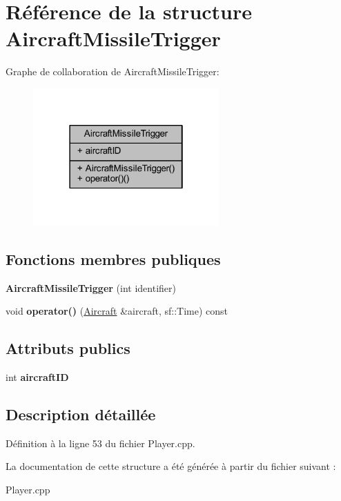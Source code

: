 \hypertarget{struct_aircraft_missile_trigger}{}\section{Référence de la structure Aircraft\+Missile\+Trigger}
\label{struct_aircraft_missile_trigger}


Graphe de collaboration de Aircraft\+Missile\+Trigger\+:\nopagebreak
\begin{figure}[H]
\begin{center}
\leavevmode
\includegraphics[width=202pt]{struct_aircraft_missile_trigger__coll__graph}
\end{center}
\end{figure}
\subsection*{Fonctions membres publiques}
\begin{DoxyCompactItemize}
\item 
\hypertarget{struct_aircraft_missile_trigger_a05b8d18e37581dc415b49b51d0ad2a11}{}\label{struct_aircraft_missile_trigger_a05b8d18e37581dc415b49b51d0ad2a11} 
{\bfseries Aircraft\+Missile\+Trigger} (int identifier)
\item 
\hypertarget{struct_aircraft_missile_trigger_a3e59059be448c10457d9b910312429f6}{}\label{struct_aircraft_missile_trigger_a3e59059be448c10457d9b910312429f6} 
void {\bfseries operator()} (\hyperlink{class_aircraft}{Aircraft} \&aircraft, sf\+::\+Time) const
\end{DoxyCompactItemize}
\subsection*{Attributs publics}
\begin{DoxyCompactItemize}
\item 
\hypertarget{struct_aircraft_missile_trigger_a27559c46b1b2fc265af9c216ffc1379f}{}\label{struct_aircraft_missile_trigger_a27559c46b1b2fc265af9c216ffc1379f} 
int {\bfseries aircraft\+ID}
\end{DoxyCompactItemize}


\subsection{Description détaillée}


Définition à la ligne 53 du fichier Player.\+cpp.



La documentation de cette structure a été générée à partir du fichier suivant \+:\begin{DoxyCompactItemize}
\item 
Player.\+cpp\end{DoxyCompactItemize}
